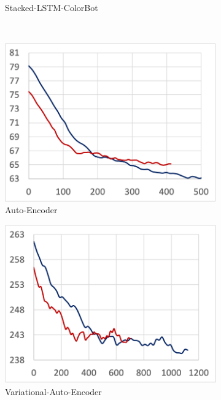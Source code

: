 \begin{figure}
\begin{subfigure}[t]{.24\textwidth}
    \caption{Stacked-LSTM-ColorBot}
  \end{subfigure}
  ~
  \begin{subfigure}[t]{.24\textwidth}
    \includegraphics[width=\textwidth]{tf2-11}
    \caption{Auto-Encoder}
  \end{subfigure}
  \par\bigskip
  \begin{subfigure}[t]{.24\textwidth}
    \includegraphics[width=\textwidth]{tf2-12}
    \caption{Variational-Auto-Encoder}
  \end{subfigure}
  ~
  \begin{subfigure}[t]{.24\textwidth}

\end{subfigure}
\end{figure}
